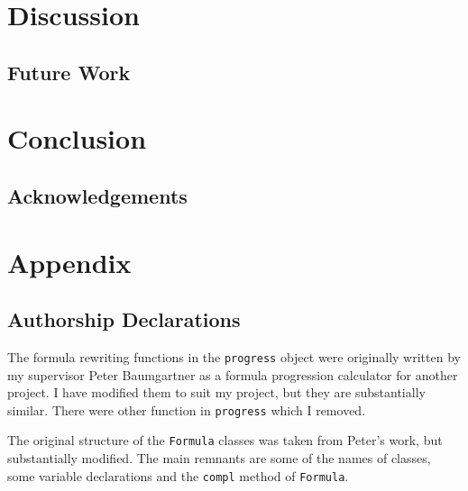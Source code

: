 \documentclass[a4paper]{article}
\begin{document}
\section{Discussion}
\subsection{Future Work}
\section{Conclusion}
\subsection{Acknowledgements}

\nocite{*}
\printbibliography{}
\newpage
\section{Appendix}\label{appendix}
\subsection{Authorship Declarations}
The formula rewriting functions in the \texttt{progress} object were originally written by my supervisor Peter Baumgartner as a formula progression calculator for another project. I have modified them to suit my project, but they are substantially similar. There were other function in \texttt{progress} which I removed.

The original structure of the \texttt{Formula} classes was taken from Peter's work, but substantially modified. The main remnants are some of the names of classes, some variable declarations and the \texttt{compl} method of \texttt{Formula}.
\end{document}
